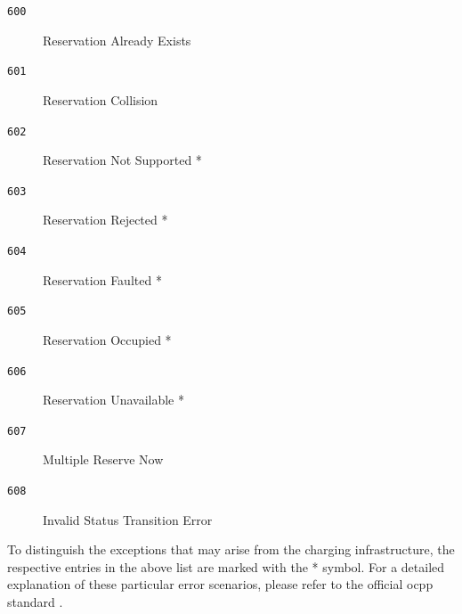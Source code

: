 \begin{multicols}{2}
\begin{description}
    \item[\texttt{600}] Reservation Already Exists
    \item[\texttt{601}] Reservation Collision
    \item[\texttt{602}] Reservation Not Supported *
    \item[\texttt{603}] Reservation Rejected *
    \item[\texttt{604}] Reservation Faulted *
\end{description}
\begin{description}
    \item[\texttt{605}] Reservation Occupied *
    \item[\texttt{606}] Reservation Unavailable *
    \item[\texttt{607}] Multiple Reserve Now
    \item[\texttt{608}] Invalid Status Transition Error
\end{description}
\end{multicols}

\noindent To distinguish the exceptions that may arise from the charging infrastructure, the respective entries in the above list are marked with the * symbol. For a detailed explanation of these particular error scenarios, please refer to the official \acrshort{ocpp} standard \cite{noauthor_ocpp_nodate}.
